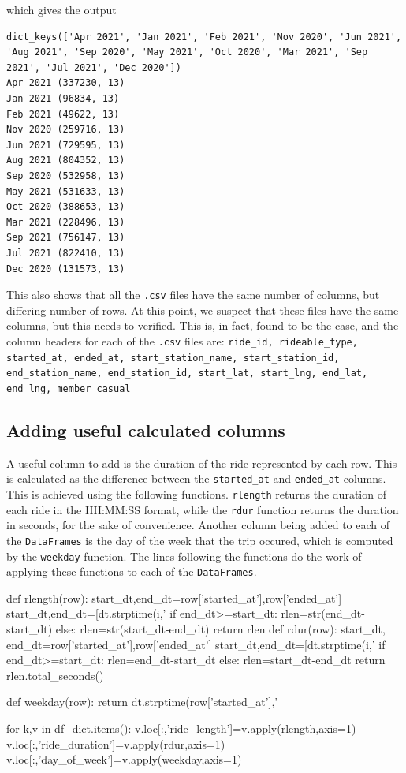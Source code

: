 \documentclass{article}
\begin{document}
which gives the output

\begin{lstlisting}[breaklines=true,
  breakatwhitespace=true]
dict_keys(['Apr 2021', 'Jan 2021', 'Feb 2021', 'Nov 2020', 'Jun 2021', 'Aug 2021', 'Sep 2020', 'May 2021', 'Oct 2020', 'Mar 2021', 'Sep 2021', 'Jul 2021', 'Dec 2020'])
Apr 2021 (337230, 13)
Jan 2021 (96834, 13)
Feb 2021 (49622, 13)
Nov 2020 (259716, 13)
Jun 2021 (729595, 13)
Aug 2021 (804352, 13)
Sep 2020 (532958, 13)
May 2021 (531633, 13)
Oct 2020 (388653, 13)
Mar 2021 (228496, 13)
Sep 2021 (756147, 13)
Jul 2021 (822410, 13)
Dec 2020 (131573, 13)
\end{lstlisting}

This also shows that all the \texttt{.csv} files have the same number of columns, but differing number of rows. At this point, we suspect that these files have the same columns, but this needs to verified. This is, in fact, found to be the case, and the column headers for each of the \texttt{.csv} files are: \texttt{ride\_id, rideable\_type, started\_at, ended\_at, start\_station\_name, start\_station\_id, end\_station\_name, end\_station\_id, start\_lat, start\_lng, end\_lat, end\_lng, member\_casual}

\subsection*{Adding useful calculated columns}

A useful column to add is the duration of the ride represented by each row. This is calculated as the difference between the \texttt{started\_at} and \texttt{ended\_at} columns. This is achieved using the following functions. \texttt{rlength} returns the duration of each ride in the HH:MM:SS format, while the \texttt{rdur} function returns the duration in seconds, for the sake of convenience. Another column being added to each of the \texttt{DataFrames} is the day of the week that the trip occured, which is computed by the \texttt{weekday} function. The lines following the functions do the work of applying these functions to each of the \texttt{DataFrames}.

\begin{pythoncode}
def rlength(row):
    start_dt,end_dt=row['started_at'],row['ended_at']
    start_dt,end_dt=[dt.strptime(i,'%
    if end_dt>=start_dt:
        rlen=str(end_dt-start_dt)
    else:
         rlen=str(start_dt-end_dt)
    return rlen
def rdur(row):
    start_dt, end_dt=row['started_at'],row['ended_at']
    start_dt,end_dt=[dt.strptime(i,'%
    if end_dt>=start_dt:
        rlen=end_dt-start_dt
    else:
        rlen=start_dt-end_dt
    return rlen.total_seconds()

def weekday(row):
    return dt.strptime(row['started_at'],'%

for k,v in df_dict.items():
    v.loc[:,'ride_length']=v.apply(rlength,axis=1)
    v.loc[:,'ride_duration']=v.apply(rdur,axis=1)
    v.loc[:,'day_of_week']=v.apply(weekday,axis=1)
\end{pythoncode}
\end{document}

